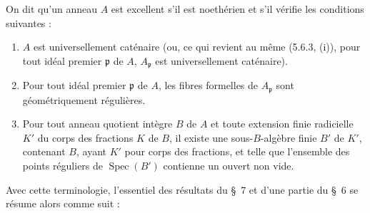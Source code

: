 \begin{definition}[7.8.2]
On dit qu'un anneau $A$ est \textup{excellent} s'il est noethérien et s'il
vérifie les conditions suivantes :
\begin{enumerate}
\item[\emph{(i)}] $A$ est universellement caténaire \textup{(ou, ce qui revient au même
(5.6.3, (i)),} pour tout idéal premier $\mathfrak p$ de $A$,
$A_{\mathfrak p}$ est universellement caténaire).
\item[\emph{(ii)}] Pour tout idéal premier $\mathfrak p$ de $A$, les fibres
formelles de $A_{\mathfrak p}$ sont géométriquement régulières.
\item[\emph{(iii)}] Pour tout anneau quotient intègre $B$ de $A$ et toute
extension finie radicielle $K'$ du corps des fractions $K$ de $B$, il existe
une sous-$B$-algèbre finie $B'$ de $K'$, contenant $B$, ayant $K'$ pour corps
des fractions, et telle que l'ensemble des points réguliers de
$\operatorname{Spec}(B')$ contienne un ouvert non vide.
\end{enumerate}

\upshape
Avec cette terminologie, l'essentiel des résultats du \S~7 et d'une partie du
\S~6 se résume alors comme suit :
\end{definition}

